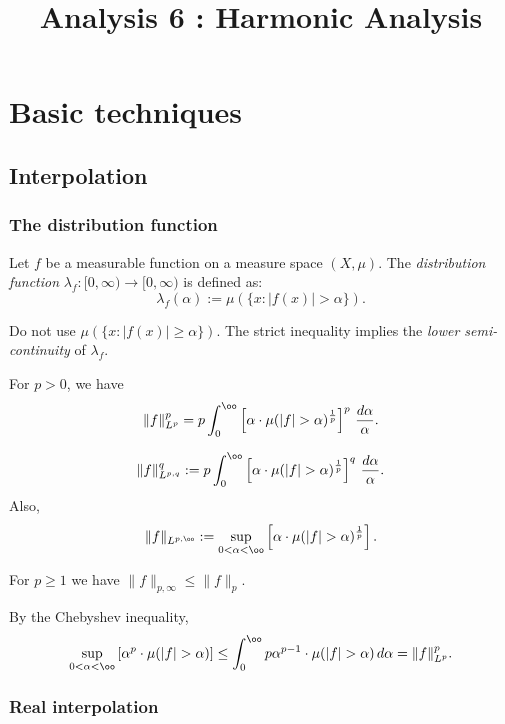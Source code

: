 \documentclass{../crs}
\title{Analysis 6 : Harmonic Analysis}
\begin{document}
\maketitle
\tableofcontents

\chapter{Basic techniques}




\section{Interpolation}



\subsection{The distribution function}
\begin{defn}
Let $f$ be a measurable function on a measure space $(X,\mu)$.
The \emph{distribution function} $\lambda_f:[0,\infty)\to [0,\infty)$ is defined as:
\[\lambda_f(\alpha):=\mu(\{x:|f(x)|>\alpha\}).\]
\end{defn}


Do not use $\mu(\{x:|f(x)|\ge\alpha\})$.
The strict inequality implies the \emph{lower semi-continuity} of $\lambda_f$.

\begin{thm}[Fubini]
For $p>0$, we have
\[\|f\|_{L^p}^p=p\int_0^\oo\left[\alpha\cdot\mu(|f|>\alpha)^\frac1p\right]^p\,\frac{d\alpha}\alpha.\]
\end{thm}
\begin{defn}
\[\|f\|_{L^{p,q}}^q:=p\int_0^\oo\left[\alpha\cdot\mu(|f|>\alpha)^\frac1p\right]^q\,\frac{d\alpha}\alpha.\]
Also,
\[\|f\|_{L^{p,\oo}}:=\sup_{0<\alpha<\oo}\left[\alpha\cdot\mu(|f|>\alpha)^\frac1p\right].\]
\end{defn}
\begin{thm}
For $p\ge1$ we have $\|f\|_{p,\infty}\le\|f\|_p$.
\end{thm}
\begin{pf}
By the Chebyshev inequality,
\[\sup_{0<\alpha<\oo}\left[\alpha^p\cdot\mu(|f|>\alpha)\right]\le\int_0^\oo p\alpha^{p-1}\cdot\mu(|f|>\alpha)\,d\alpha=\|f\|_{L^p}^p.\]

\end{pf}





\subsection{Real interpolation}
\end{document}
